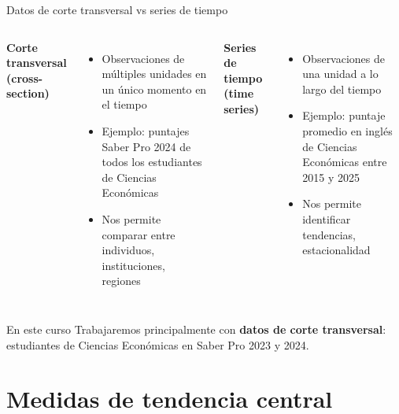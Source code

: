 \documentclass[aspectratio=169, 11pt]{beamer}
\begin{document}
\begin{frame}{Datos de corte transversal vs series de tiempo}
\begin{columns}[T]
\textbf{Corte transversal (cross-section)}
\begin{itemize}
\item Observaciones de múltiples unidades en un \alert{único momento en el tiempo}
\item Ejemplo: puntajes Saber Pro 2024 de todos los estudiantes de Ciencias Econ\'omicas
\item Nos permite comparar entre individuos, instituciones, regiones
\end{itemize}

\textbf{Series de tiempo (time series)}
\begin{itemize}
\item Observaciones de una unidad a lo largo del \alert{tiempo}
\item Ejemplo: puntaje promedio en inglés de Ciencias Econ\'omicas entre 2015 y 2025
\item Nos permite identificar tendencias, estacionalidad
\end{itemize}
\end{columns}

\vspace{1em}
\begin{exampleblock}{En este curso}
Trabajaremos principalmente con \textbf{datos de corte transversal}: estudiantes de Ciencias Econ\'omicas en Saber Pro 2023 y 2024.
\end{exampleblock}
\end{frame}

\section{Medidas de tendencia central}
\end{document}
